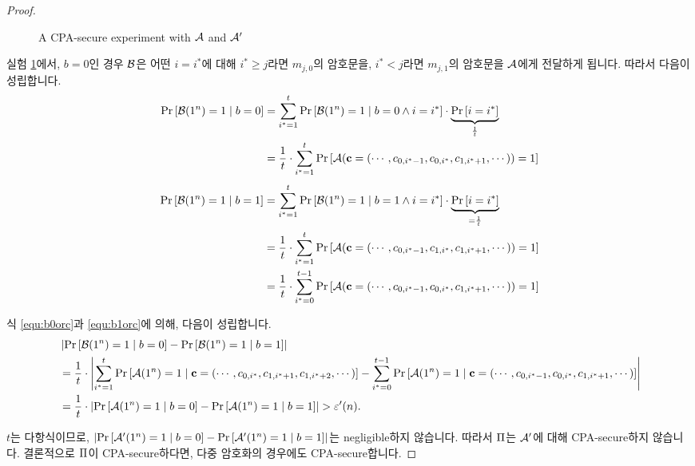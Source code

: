 \begin{proof}
\begin{figure}[h]
    \caption{A CPA-secure experiment with $\mathcal{A}$ and $\mathcal{A}'$}
    \label{fig:cpa_to_lr_cpa}
  \end{figure}

  실험 \ref{fig:cpa_to_lr_cpa}에서, $b = 0$인 경우 $\mathcal{B}$은 어떤 $i = i^*$에 대해 
  $i^* \ge j$라면 $m_{j, 0}$의 암호문을, $i^* < j$라면 $m_{j, 1}$의 암호문을 $\mathcal{A}$에게 
  전달하게 됩니다. 따라서 다음이 성립합니다.
  \begin{equation}
    \begin{split}
      \text{Pr} \left[ \mathcal{B}(1^n) = 1 \;|\; b = 0 \right] 
      &= \sum_{i^* = 1}^t \text{Pr} \left[ \mathcal{B}(1^n) = 1 \;|\; b = 0 \wedge i = i^* \right]
      \cdot \underbrace{\text{Pr} \left[ i = i^* \right]}_{\frac{1}{t}} \\
      &= \frac{1}{t} \cdot \sum_{i^* = 1}^t \text{Pr} \left[ \mathcal{A}(\mathbf{c} 
      = (\cdots, c_{0, i^* - 1}, c_{0, i^*}, c_{1, i^* + 1}, \cdots)) = 1 \right]
      \label{equ:b0orc}
    \end{split}
  \end{equation}
  \begin{equation}
    \begin{split}
      \text{Pr} \left[ \mathcal{B}(1^n) = 1 \;|\; b = 1 \right] 
      &= \sum_{i^* = 1}^t \text{Pr} \left[ \mathcal{B}(1^n) = 1 \;|\; b = 1 \wedge i = i^* \right] 
      \cdot \underbrace{\text{Pr} \left[ i = i^* \right]}_{=\frac{1}{t}} \\
      &= \frac{1}{t} \cdot \sum_{i^* = 1}^t \text{Pr} \left[ \mathcal{A}(\mathbf{c} 
      = (\cdots, c_{0, i^* - 1}, c_{1, i^*}, c_{1, i^* + 1}, \cdots)) = 1 \right] \\
      &= \frac{1}{t} \cdot \sum_{i^* = 0}^{t - 1} 
      \text{Pr} \left[ \mathcal{A}(\mathbf{c} 
      = (\cdots, c_{0, i^* - 1}, c_{0, i^*}, c_{1, i^* + 1}, \cdots)) = 1 \right] \\
      \label{equ:b1orc}
    \end{split}
  \end{equation}

  식 \ref{equ:b0orc}과 \ref{equ:b1orc}에 의해, 다음이 성립합니다.
  \begin{equation}
    \begin{split}
      & \left| 
        \text{Pr} \left[ \mathcal{B}(1^n) = 1 \;|\; b = 0 \right] - \text{Pr} \left[ \mathcal{B}(1^n) = 1 \;|\; b = 1 \right]
       \right| \\
      &= \frac{1}{t} \cdot \left| 
        \sum_{i^* = 1}^t \text{Pr} \left[ \mathcal{A}(1^n) = 1 \;|\; \mathbf{c} 
        = (\cdots, c_{0, i^*}, c_{1, i^* + 1}, c_{1, i^* + 2}, \cdots) \right]
        - \sum_{i^* = 0}^{t-1} \text{Pr} \left[ \mathcal{A}(1^n) = 1 \;|\; \mathbf{c} 
        = (\cdots, c_{0, i^* - 1}, c_{0, i^*}, c_{1, i^* + 1}, \cdots) \right]
         \right| \\
      &= \frac{1}{t} \cdot \left| \text{Pr} \left[ \mathcal{A}(1^n) = 1 \;|\; b = 0 \right]
       - \text{Pr} \left[ \mathcal{A}(1^n) = 1 \;|\; b = 1 \right] \right| > \varepsilon'(n).
    \end{split}
  \end{equation}


  $t$는 다항식이므로, $\left| \text{Pr} \left[ \mathcal{A}'(1^n) = 1 \;|\; b = 0 \right] - \text{Pr} \left[ \mathcal{A}'(1^n) = 1 \;|\; b = 1 \right] \right|$는 negligible하지 않습니다. 따라서 $\Pi$는 $\mathcal{A}'$에 대해 CPA-secure하지 않습니다. 결론적으로 $\Pi$이 CPA-secure하다면, 다중 암호화의 경우에도 CPA-secure합니다.
\end{proof}